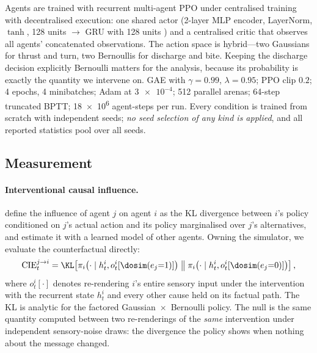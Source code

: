 Agents are trained with recurrent multi-agent PPO
\citep{yu2022surprising,schulman2017proximal} under centralised training with
decentralised execution: one shared actor (2-layer MLP encoder, LayerNorm, $\tanh$,
128 units $\rightarrow$ GRU with 128 units \citep{cho2014learning}) and a
centralised critic that observes all agents' concatenated observations. The action
space is hybrid---two Gaussians for thrust and turn, two Bernoullis for discharge
and bite. Keeping the discharge decision explicitly Bernoulli matters for the
analysis, because its probability is exactly the quantity we intervene on. GAE
\citep{schulman2016high} with $\gamma=0.99$, $\lambda=0.95$; PPO clip $0.2$; 4
epochs, 4 minibatches; Adam at $\num{3e-4}$; 512 parallel arenas; 64-step
truncated BPTT; \SI{18e6}{} agent-steps per run. Every condition is trained from
scratch with independent seeds; \emph{no seed selection of any kind is applied},
and all reported statistics pool over all seeds.

\subsection{Measurement}

\paragraph{Interventional causal influence.}
\citet{jaques2019social} define the influence of agent $j$ on agent $i$ as the KL
divergence between $i$'s policy conditioned on $j$'s actual action and its policy
marginalised over $j$'s alternatives, and estimate it with a learned model of
other agents. Owning the simulator, we evaluate the counterfactual directly:
\begin{equation}
\mathrm{CIE}^{j\to i}_t = \KL\!\left[
  \pi_i\!\left(\cdot \mid h^i_t, o^i_t[\dosim(e_j{=}1)]\right)
  \;\middle\|\;
  \pi_i\!\left(\cdot \mid h^i_t, o^i_t[\dosim(e_j{=}0)]\right)\right],
\label{eq:cie}
\end{equation}
where $o^i_t[\cdot]$ denotes re-rendering $i$'s entire sensory input under the
intervention with the recurrent state $h^i_t$ and every other cause held on its
factual path. The KL is analytic for the factored
Gaussian~$\times$~Bernoulli policy. The null is the same quantity computed between
two re-renderings of the \emph{same} intervention under independent sensory-noise
draws: the divergence the policy shows when nothing about the message changed.

